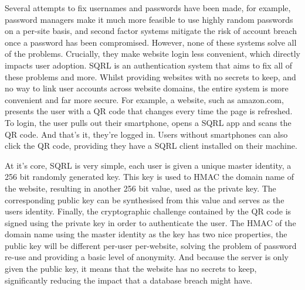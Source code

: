 Several attempts to fix usernames and passwords have been made, for example, password managers make it much more feasible to use highly random passwords on a per-site basis, and second factor systems mitigate the risk of account breach once a password has been compromised. However, none of these systems solve all of the problems. Crucially, they make website login less convenient, which directly impacts user adoption. SQRL is an authentication system that aims to fix all of these problems and more. Whilst providing websites with no secrets to keep, and no way to link user accounts across website domains, the entire system is more convenient and far more secure. For example, a website, such as amazon.com, presents the user with a QR code that changes every time the page is refreshed. To login, the user pulls out their smartphone, opens a SQRL app and scans the QR code. And that's it, they're logged in. Users without smartphones can also click the QR code, providing they have a SQRL client installed on their machine.

At it's core, SQRL is very simple, each user is given a unique master identity, a 256 bit randomly generated key. This key is used to HMAC the domain name of the website, resulting in another 256 bit value, used as the private key. The corresponding public key can be synthesised from this value and serves as the users identity. Finally, the cryptographic challenge contained by the QR code is signed using the private key in order to authenticate the user. The HMAC of the domain name using the master identity as the key has two nice properties, the public key will be different per-user per-website, solving the problem of password re-use and providing a basic level of anonymity. And because the server is only given the public key, it means that the website has no secrets to keep, significantly reducing the impact that a database breach might have.
